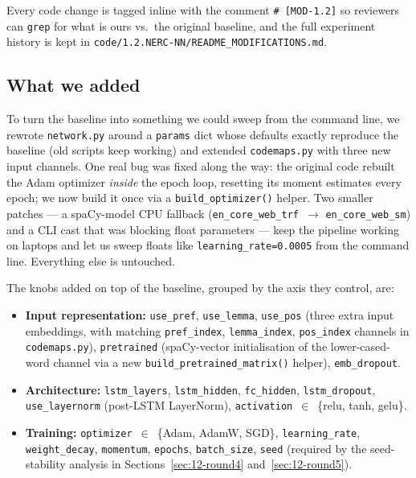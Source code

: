 \documentclass[a4paper,12pt]{article}
\begin{document}
Every code change is tagged inline with the comment \texttt{\# [MOD-1.2]}
so reviewers can \texttt{grep} for what is ours vs.\ the original
baseline, and the full experiment history is kept in
\texttt{code/1.2.NERC-NN/README\_MODIFICATIONS.md}.

\subsection{What we added}
\label{sec:12-mods}

To turn the baseline into something we could sweep from the command
line, we rewrote \texttt{network.py} around a \texttt{params} dict
whose defaults exactly reproduce the baseline (old scripts keep
working) and extended \texttt{codemaps.py} with three new input
channels. One real bug was fixed along the way: the original code
rebuilt the Adam optimizer \emph{inside} the epoch loop, resetting
its moment estimates every epoch; we now build it once via a
\texttt{build\_optimizer()} helper. Two smaller patches --- a
spaCy-model CPU fallback (\texttt{en\_core\_web\_trf}~$\to$
\texttt{en\_core\_web\_sm}) and a CLI cast that was blocking float
parameters --- keep the pipeline working on laptops and let us sweep
floats like \texttt{learning\_rate=0.0005} from the command line.
Everything else is untouched.

The knobs added on top of the baseline, grouped by the axis they
control, are:

\begin{itemize}[nosep]
    \item \textbf{Input representation:} \texttt{use\_pref},
          \texttt{use\_lemma}, \texttt{use\_pos} (three extra input
          embeddings, with matching \texttt{pref\_index},
          \texttt{lemma\_index}, \texttt{pos\_index} channels in
          \texttt{codemaps.py}), \texttt{pretrained} (spaCy-vector
          initialisation of the lower-cased-word channel via a new
          \texttt{build\_pretrained\_matrix()} helper),
          \texttt{emb\_dropout}.
    \item \textbf{Architecture:} \texttt{lstm\_layers},
          \texttt{lstm\_hidden}, \texttt{fc\_hidden},
          \texttt{lstm\_dropout}, \texttt{use\_layernorm}
          (post-LSTM LayerNorm),
          \texttt{activation}~$\in$~\{relu, tanh, gelu\}.
    \item \textbf{Training:} \texttt{optimizer}~$\in$~\{Adam, AdamW,
          SGD\}, \texttt{learning\_rate}, \texttt{weight\_decay},
          \texttt{momentum}, \texttt{epochs}, \texttt{batch\_size},
          \texttt{seed} (required by the seed-stability analysis in
          Sections~\ref{sec:12-round4} and~\ref{sec:12-round5}).
\end{itemize}
\end{document}
